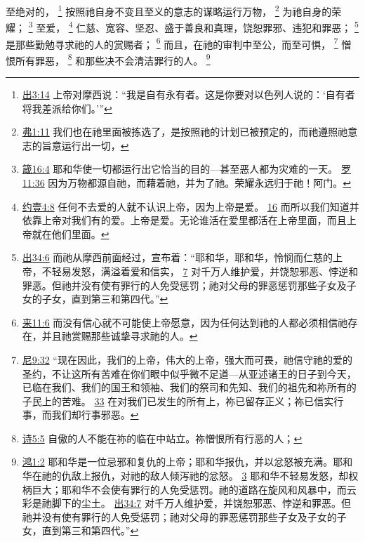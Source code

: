 \documentclass[12pt, a4paper, oneside]{ctexart}
\begin{document}
	至绝对的，
	\footnote {
		\href{https://biblehub.com/exodus/3-14.htm}{出3:14} 上帝对摩西说：“我是自有永有者。这是你要对以色列人说的：‘自有者将我差派给你们。’”
	}
	按照祂自身不变且至义的意志的谋略运行万物，
	\footnote {
		\href{https://biblehub.com/ephesians/1-11.htm}{弗1:11} 我们也在祂里面被拣选了，是按照祂的计划已被预定的，而祂遵照祂意志的旨意运行出一切，
	}
	为祂自身的荣耀；
	\footnote {
		\href{https://biblehub.com/proverbs/16-4.htm}{箴16:4} 耶和华使一切都运行出它恰当的目的---甚至恶人都为灾难的一天。
		\href{https://biblehub.com/romans/11-36.htm}{罗11:36} 因为万物都源自祂，而藉着祂，并为了祂。荣耀永远归于祂！阿门。
	}
	至爱，
	\footnote {
		\href{https://biblehub.com/1_john/4-8.htm}{约壹4:8} 任何不去爱的人就不认识上帝，因为上帝是爱。
		\href{https://biblehub.com/1_john/4-16.htm}{16} 而所以我们知道并依靠上帝对我们有的爱。上帝是爱。无论谁活在爱里都活在上帝里面，而且上帝就在他们里面。
	}
	仁慈、宽容、坚忍、盛于善良和真理，饶恕罪邪、违犯和罪恶；
	\footnote {
		\href{https://biblehub.com/exodus/34-6.htm}{出34:6} 而祂从摩西前面经过，宣布着：“耶和华，耶和华，怜悯而仁慈的上帝，不轻易发怒，满溢着爱和信实，
		\href{https://biblehub.com/exodus/34-7.htm}{7} 对千万人维护爱，并饶恕邪恶、悖逆和罪恶。但祂并没有使有罪行的人免受惩罚；祂对父母的罪恶惩罚那些子女及子女的子女，直到第三和第四代。”
	}
	是那些勤勉寻求祂的人的赏赐者；
	\footnote {
		\href{https://biblehub.com/hebrews/11-6.htm}{来11:6} 而没有信心就不可能使上帝愿意，因为任何达到祂的人都必须相信祂存在，并且祂赏赐那些诚挚寻求祂的人。
	}
	而且，在祂的审判中至公，而至可惧，
	\footnote {
		\href{https://biblehub.com/nehemiah/9-32.htm}{尼9:32} “现在因此，我们的上帝，伟大的上帝，强大而可畏，祂信守祂的爱的圣约，不让这所有苦难在你们眼中似乎微不足道---从亚述诸王的日子到今天，已临在我们、我们的国王和领袖、我们的祭司和先知、我们的祖先和祢所有的子民上的苦难。
		\href{https://biblehub.com/nehemiah/9-33.htm}{33} 在对我们已发生的所有上，祢已留存正义；祢已信实行事，而我们却行事邪恶。
	}
	憎恨所有罪恶，
	\footnote {
		\href{https://biblehub.com/psalms/5-5.htm}{诗5:5} 自傲的人不能在祢的临在中站立。祢憎恨所有行恶的人；
	}
	和那些决不会清洁罪行的人。
	\footnote {
		\href{https://biblehub.com/nahum/1-2.htm}{鸿1:2} 耶和华是一位忌邪和复仇的上帝；耶和华报仇，并以忿怒被充满。耶和华在祂的仇敌上报仇，对祂的敌人倾泻祂的忿怒。
		\href{https://biblehub.com/nahum/1-3.htm}{3} 耶和华不轻易发怒，却权柄巨大；耶和华不会使有罪行的人免受惩罚。祂的道路在旋风和风暴中，而云彩是祂脚下的尘土。
		\href{https://biblehub.com/exodus/34-7.htm}{出34:7} 对千万人维护爱，并饶恕邪恶、悖逆和罪恶。但祂并没有使有罪行的人免受惩罚；祂对父母的罪恶惩罚那些子女及子女的子女，直到第三和第四代。”
	}
\end{document}
